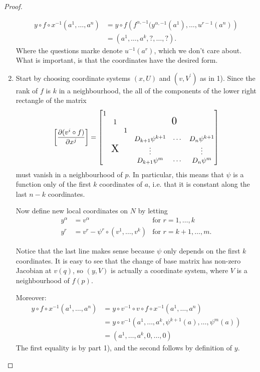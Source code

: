 \documentclass[11pt, english]{article}
\begin{document}
\begin{proof}
\begin{enumerate}
\begin{align*}
y \circ f \circ x^{-1}(a^1,\dotsc, a^n) &= y \circ f\left(f^{\alpha,-1}(y^{\alpha,-1}(a^1),\dotsc, u^{r-1}(a^n)\right) \\
&= \left( a^1,\dotsc, a^k,?,\dotsc, ? \right).
\end{align*}
Where the questions marke denote $u^{-1}(a^r)$, which we don't care about. What is important, is that the coordinates have the desired form.
\item
Start by choosing coordinate systems $(x,U)$ and $(v,V^\prime)$ as in 1). Since the rank of $f$ is $k$ in a neighbourhood, the all of the components of the lower right rectangle of the matrix
\[
\left[ \dd{(v^i \circ f)}{x^j} \right] = \begin{bmatrix}
\begin{matrix}1 & & \\  & 1 &  \\&  & 1\end{matrix} & \scalebox{1.5}0 \\
\scalebox {1.5}X & \begin{matrix} D_{k+1}\psi^{k+1} &\dotsb  & D_n\psi^{k+1} \\
\vdots & & \vdots \\
D_{k+1}\psi^m & \dotsb & D_n\psi^m \end{matrix}
\end{bmatrix}
\]
must vanish in a neighbourhood  of $p$. In particular, this means that $\psi$ is a function only of the first $k$ coordinates of $a$, i.e. that it is constant along the last $n-k$ coordinates.

Now define new local coordinates on $N$ by letting
\begin{align*}
y^\alpha &= v^\alpha &\text{for } r=1,\dotsc,k \\
y^r &= v^r - \psi^r \circ ( v^1, \dotsc, v^k) &\text{for } r=k+1,\dotsc, m.
\end{align*}

Notice that the last line makes sense because $\psi$ only depends on the first $k$ coordinates. It is easy to see that the change of base matrix has non-zero Jacobian at $v(q)$, so $(y,V)$ is actually a coordinate system, where $V$ is a neighbourhood of $f(p)$.

Moreover:
\begin{align*}
y \circ f \circ x^{-1} ( a^1, \dotsc, a^n) &= y \circ v^{-1} \circ v \circ f \circ x^{-1}(a^1,\dotsc, a^n) \\
&= y \circ v^{-1}\left(a^1,\dotsc, a^k, \psi^{k+1}(a),\dotsc, \psi^m(a)\right) \\
&= \left( a^1, \dotsc, a^k, 0,\dotsc,0 \right)
\end{align*}
The first equality is by part 1), and the second follows by definition of $y$.
  \end{enumerate}
\end{proof}
\end{document}
